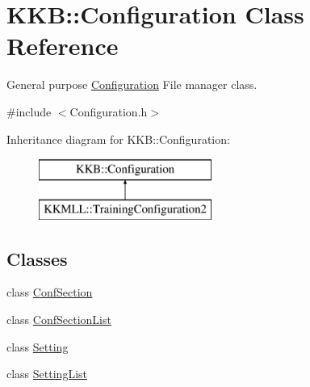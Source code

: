 \hypertarget{class_k_k_b_1_1_configuration}{}\section{K\+KB\+:\+:Configuration Class Reference}
\label{class_k_k_b_1_1_configuration}


General purpose \hyperlink{class_k_k_b_1_1_configuration}{Configuration} File manager class.  




{\ttfamily \#include $<$Configuration.\+h$>$}

Inheritance diagram for K\+KB\+:\+:Configuration\+:\begin{figure}[H]
\begin{center}
\leavevmode
\includegraphics[height=2.000000cm]{class_k_k_b_1_1_configuration}
\end{center}
\end{figure}
\subsection*{Classes}
\begin{DoxyCompactItemize}
\item 
class \hyperlink{class_k_k_b_1_1_configuration_1_1_conf_section}{Conf\+Section}
\item 
class \hyperlink{class_k_k_b_1_1_configuration_1_1_conf_section_list}{Conf\+Section\+List}
\item 
class \hyperlink{class_k_k_b_1_1_configuration_1_1_setting}{Setting}
\item 
class \hyperlink{class_k_k_b_1_1_configuration_1_1_setting_list}{Setting\+List}
\end{DoxyCompactItemize}
